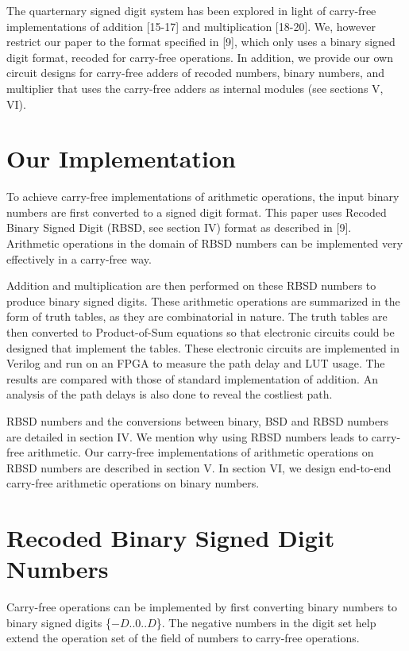 \documentclass[conference]{IEEEtran_IBSS}
\begin{document}
The quarternary signed digit system has been explored in light of carry-free implementations of addition [15-17] and multiplication [18-20]. We, however restrict our paper to the format specified in [9], which only uses a binary signed digit format, recoded for carry-free operations. In addition, we provide our own circuit designs for carry-free adders of recoded numbers, binary numbers, and multiplier that uses the carry-free adders as internal modules (see sections V, VI).


\section{Our Implementation}

To achieve carry-free implementations of arithmetic operations, the input binary numbers are first converted to a signed digit format. This paper uses Recoded Binary Signed Digit (RBSD, see section IV) format as described in [9]. Arithmetic operations in the domain of RBSD numbers can be implemented very effectively in a carry-free way.

Addition and multiplication are then performed on these RBSD numbers to produce binary signed digits. These arithmetic operations are summarized in the form of truth tables, as they are combinatorial in nature. The truth tables are then converted to Product-of-Sum equations so that electronic circuits could be designed that implement the tables. These electronic circuits are implemented in Verilog and run on an FPGA to measure the path delay and LUT usage. The results are compared with those of standard implementation of addition. An analysis of the path delays is also done to reveal the costliest path.

RBSD numbers and the conversions between binary, BSD and RBSD numbers are detailed in section IV. We mention why using RBSD numbers leads to carry-free arithmetic. Our carry-free implementations of arithmetic operations on RBSD numbers are described in section V. In section VI, we design end-to-end carry-free arithmetic operations on binary numbers.


\section{Recoded Binary Signed Digit Numbers}

Carry-free operations can be implemented by first converting binary numbers to binary signed digits \{$-D$..$0$..$D$\}. The negative numbers in the digit set help extend the operation set of the field of numbers to carry-free operations.
\end{document}

